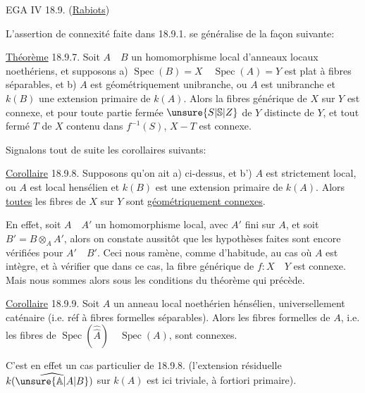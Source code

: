 
EGA IV 18.9. \qquad (\uline{Rabiots})

L'assertion de connexité faite dans 18.9.1. se généralise de la façon suivante:

\uline{Théorème} 18.9.7. Soit $A\quad B$ un homomorphisme local d'anneaux locaux noethériens, et supposons a)  $\operatorname{Spec}(B)=X\quad\operatorname{Spec}(A)=Y$ est plat à fibres séparables, et b) $A$ est géométriquement unibranche, ou $A$ est unibranche et $k(B)$ une extension primaire de $k(A)$. Alors la fibres générique de $X$ sur $Y$ est connexe, et pour toute partie fermée $\unsure{S|\mathbb S|Z}$ de $Y$ distincte de $Y$,  et tout fermé $T$ de $X$ contenu dans $f^{-1}(S)$, $X-T$ est connexe.

Signalons tout de suite les corollaires suivants:

\uline{Corollaire} 18.9.8. Supposons qu'on ait a) ci-dessus, et b') $A$ est strictement local, ou $A$ est local hensélien et $k(B)$ est une extension primaire de $k(A)$. Alors \uline{toutes} les fibres de $X$ sur $Y$ sont \uline{géométriquement connexes}.

En effet, soit $A\quad A'$ un homomorphisme local, avec $A'$ fini sur $A$, et soit $B'=B\otimes_A A'$, alors on constate aussitôt que les hypothèses faites sont encore vérifiées pour $A'\quad B'$. Ceci nous ramène, comme d'habitude, au cas où $A$ est intègre, et à vérifier que dans ce cas, la fibre générique de $f:X\quad Y$ est connexe. Mais nous sommes alors sous les conditions du théorème qui précède.

\uline{Corollaire} 18.9.9. Soit $A$ un anneau local noethérien hénsélien,  universellement caténaire (i.e. réf \quad à fibres formelles séparables). Alors les fibres formelles de $A$, i.e. les fibres de $\operatorname{Spec}(\hat{\hat A})\quad\operatorname{Spec}(A)$, sont  connexes.

C'est en effet un cas particulier de 18.9.8. (l'extension résiduelle $k(\widehat{\unsure{\mathbb A|A|B}})$ sur $k(A)$ est ici triviale, à fortiori primaire).
